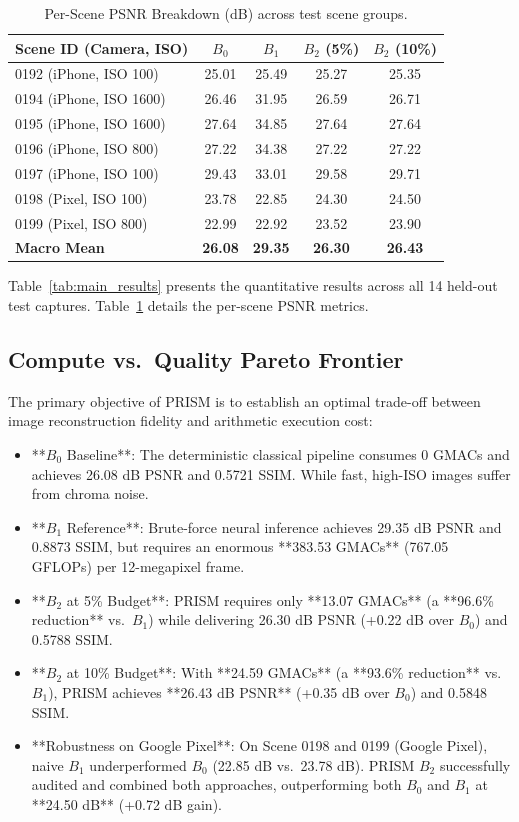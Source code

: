 \documentclass[10pt,twocolumn]{article}
\begin{document}
\begin{table}[h]
\centering
\caption{Per-Scene PSNR Breakdown (dB) across test scene groups.}
\label{tab:scene_breakdown}
\footnotesize
\begin{tabular}{lcccc}
\toprule
\textbf{Scene ID (Camera, ISO)} & \textbf{$B_0$} & \textbf{$B_1$} & \textbf{$B_2$ (5\%)} & \textbf{$B_2$ (10\%)} \\
\midrule
0192 (iPhone, ISO 100) & 25.01 & 25.49 & 25.27 & 25.35 \\
0194 (iPhone, ISO 1600) & 26.46 & 31.95 & 26.59 & 26.71 \\
0195 (iPhone, ISO 1600) & 27.64 & 34.85 & 27.64 & 27.64 \\
0196 (iPhone, ISO 800) & 27.22 & 34.38 & 27.22 & 27.22 \\
0197 (iPhone, ISO 100) & 29.43 & 33.01 & 29.58 & 29.71 \\
0198 (Pixel, ISO 100) & 23.78 & 22.85 & 24.30 & 24.50 \\
0199 (Pixel, ISO 800) & 22.99 & 22.92 & 23.52 & 23.90 \\
\midrule
\textbf{Macro Mean} & \textbf{26.08} & \textbf{29.35} & \textbf{26.30} & \textbf{26.43} \\
\bottomrule
\end{tabular}
\end{table}

Table~\ref{tab:main_results} presents the quantitative results across all 14 held-out test captures. Table~\ref{tab:scene_breakdown} details the per-scene PSNR metrics.

\subsection{Compute vs.\ Quality Pareto Frontier}
The primary objective of PRISM is to establish an optimal trade-off between image reconstruction fidelity and arithmetic execution cost:
\begin{itemize}
    \item **$B_0$ Baseline**: The deterministic classical pipeline consumes 0 GMACs and achieves 26.08 dB PSNR and 0.5721 SSIM. While fast, high-ISO images suffer from chroma noise.
    \item **$B_1$ Reference**: Brute-force neural inference achieves 29.35 dB PSNR and 0.8873 SSIM, but requires an enormous **383.53 GMACs** (767.05 GFLOPs) per 12-megapixel frame.
    \item **$B_2$ at 5\% Budget**: PRISM requires only **13.07 GMACs** (a **96.6\% reduction** vs.\ $B_1$) while delivering 26.30 dB PSNR (+0.22 dB over $B_0$) and 0.5788 SSIM.
    \item **$B_2$ at 10\% Budget**: With **24.59 GMACs** (a **93.6\% reduction** vs.\ $B_1$), PRISM achieves **26.43 dB PSNR** (+0.35 dB over $B_0$) and 0.5848 SSIM.
    \item **Robustness on Google Pixel**: On Scene 0198 and 0199 (Google Pixel), naive $B_1$ underperformed $B_0$ (22.85 dB vs.\ 23.78 dB). PRISM $B_2$ successfully audited and combined both approaches, outperforming both $B_0$ and $B_1$ at **24.50 dB** (+0.72 dB gain).
\end{itemize}
\end{document}
